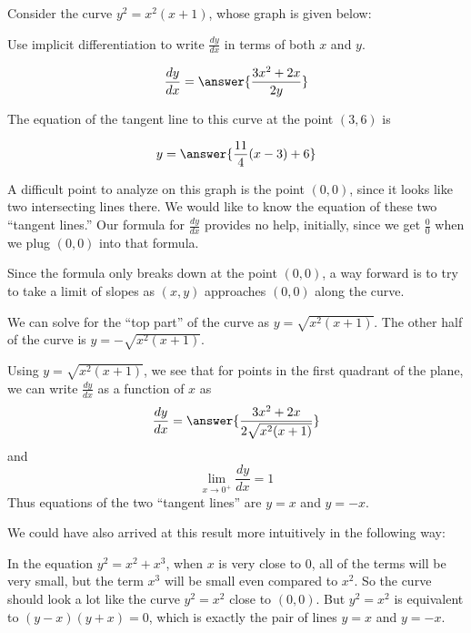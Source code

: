 \documentclass{ximera}
\author{Steven Gubkin}
\begin{document}
\begin{exercise}

Consider the curve  $y^2 = x^2(x+1)$, whose graph is given below:

\begin{image}
\end{image}

Use implicit differentiation to write $\frac{dy}{dx}$ in terms of both $x$ and $y$.

\[
\frac{dy}{dx} = \answer{\frac{3x^2+2x}{2y}}
\]

The equation of the tangent line to this curve at the point $(3,6)$ is

\[
y = \answer{\frac{11}{4}(x-3)+6}
\]

A difficult point to analyze on this graph is the point $(0,0)$, since
it looks like two intersecting lines there.  We would like to know the
equation of these two ``tangent lines.''  Our formula for
$\frac{dy}{dx}$ provides no help, initially, since we get
$\frac{0}{0}$ when we plug $(0,0)$ into that formula.

Since the formula only breaks down at the point $(0,0)$, a way forward
is to try to take a limit of slopes as $(x,y)$ approaches $(0,0)$
along the curve.

We can solve for the ``top part'' of the curve as $y =
\sqrt{x^2(x+1)}$.  The other half of the curve is $y =
-\sqrt{x^2(x+1)}$.

Using $y = \sqrt{x^2(x+1)}$, we see that for points in the first
quadrant of the plane, we can write $\frac{dy}{dx}$ as a function of
$x$ as
\[
\frac{dy}{dx} = \answer{\frac{3x^2+2x}{2\sqrt{x^2(x+1)}}}
\]
and
\[
\lim_{x \to 0^+} \frac{dy}{dx} = 1
\]
Thus equations of the two ``tangent lines'' are $y=x$ and $y=-x$.

We could have also arrived at this result more intuitively in the following way:

In the equation $y^2 = x^2+x^3$, when $x$ is very close to $0$, all of
the terms will be very small, but the term $x^3$ will be small even
compared to $x^2$.  So the curve should look a lot like the curve $y^2
= x^2$ close to $(0,0)$.  But $y^2 = x^2$ is equivalent to
$(y-x)(y+x)=0$, which is exactly the pair of lines $y=x$ and $y=-x$.
\end{exercise}
\end{document}

